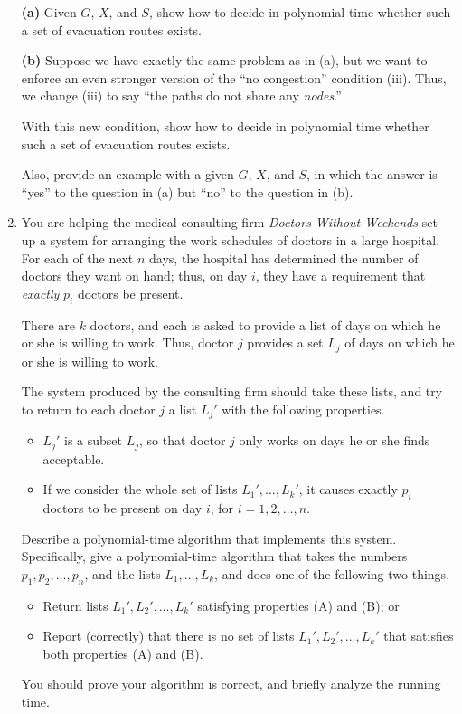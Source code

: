 \documentclass[12pt]{article}
\begin{document}
\begin{enumerate}
{\bf (a)} Given $G$, $X$, and $S$, show how to decide in
polynomial time whether such a set of evacuation routes exists.

\vskip 0.1in
{\bf (b)} Suppose we have exactly the same problem as in (a),
but we want to enforce an even stronger version of
the ``no congestion'' condition (iii).
Thus, we change (iii) to say
``the paths do not share any {\em nodes}.''

With this new condition, show how to decide in
polynomial time whether such a set of evacuation routes exists.

Also, provide an example with a given $G$, $X$, and $S$, in which
the answer is ``yes'' to the question in (a) but ``no''
to the question in (b).





\item

You are helping the medical consulting firm
{\em Doctors Without Weekends} set up a system
for arranging the work schedules of doctors in a large hospital.
For each of the next $n$ days, the hospital has
determined the number of doctors they want on hand;
thus, on day $i$, they have a requirement that
{\em exactly} $p_i$ doctors be present.

There are $k$ doctors, and each is asked to provide
a list of days on which he or she is willing to work.
Thus, doctor $j$ provides a set $L_j$ of days
on which he or she is willing to work.

The system produced by the consulting firm should
take these lists, %
and try to return to each doctor $j$ a
list $L_j'$ with the following properties.
\begin{itemize}
\item[(A)] $L_j'$ is a subset $L_j$, so that doctor $j$
only works on days he or she finds acceptable.
\item[(B)] If we consider the whole set of lists $L_1', \ldots, L_k'$,
it causes exactly $p_i$ doctors to be present on day $i$,
for $i = 1, 2, \ldots, n$.
\end{itemize}

\bigskip
{}
Describe a polynomial-time algorithm that implements
this system.
Specifically, give a polynomial-time algorithm that takes the
numbers $p_1, p_2, \ldots, p_n$,
and the lists $L_1, \ldots, L_k$,
and does one of the following two things.
\begin{itemize}
\item Return lists $L_1', L_2', \ldots, L_k'$
satisfying properties (A) and (B); or
\item Report (correctly) that there is no
set of lists $L_1', L_2', \ldots, L_k'$
that satisfies both properties (A) and (B).
\end{itemize}
You should prove your algorithm is correct, and
briefly analyze the running time.


\end{enumerate}
\end{document}
